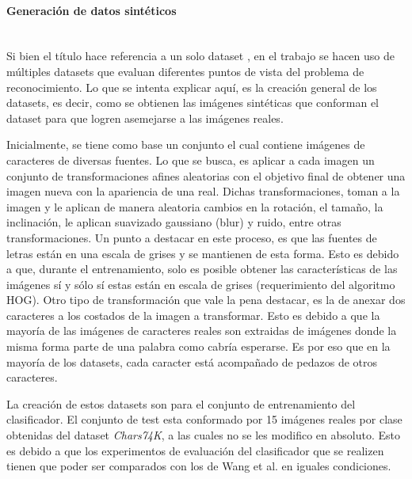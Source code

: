 		\paragraph{Generación de datos sintéticos} ~\\

			Si bien el título hace referencia a un solo dataset , en el trabajo se hacen uso de múltiples datasets que evaluan diferentes puntos de vista del problema de reconocimiento. Lo que se intenta explicar aquí, es la creación general de los datasets, es decir, como se obtienen las imágenes sintéticas que conforman el dataset para que logren asemejarse a las imágenes reales.

			Inicialmente, se tiene como base un conjunto el cual contiene imágenes de caracteres de diversas fuentes. Lo que se busca, es aplicar a cada imagen un conjunto de transformaciones afines aleatorias con el objetivo final de obtener una imagen nueva con la apariencia de una real. Dichas transformaciones, toman a la imagen y le aplican de manera aleatoria cambios en la rotación, el tamaño, la inclinación, le aplican suavizado gaussiano (blur) y ruido, entre otras transformaciones. Un punto a destacar en este proceso, es que las fuentes de letras están en una escala de grises y se mantienen de esta forma. Esto es debido a que, durante el entrenamiento, solo es posible obtener las características de las imágenes sí y sólo sí estas están en escala de grises (requerimiento del algoritmo HOG). Otro tipo de transformación que vale la pena destacar, es la de anexar dos caracteres a los costados de la imagen a transformar. Esto es debido a que la mayoría de las imágenes de caracteres reales son extraidas de imágenes donde la misma forma parte de una palabra como cabría esperarse. Es por eso que en la mayoría de los datasets, cada caracter está acompañado de pedazos de otros caracteres.

			La creación de estos datasets son para el conjunto de entrenamiento del clasificador. El conjunto de test esta conformado por 15 imágenes reales por clase obtenidas del dataset \textit{Chars74K}, a las cuales no se les modifico en absoluto. Esto es debido a que los experimentos de evaluación del clasificador que se realizen tienen que poder ser comparados con los de Wang et al. en iguales condiciones.


